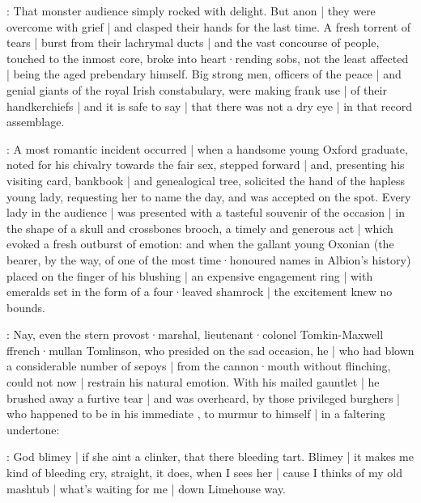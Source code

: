 :
That monster audience simply rocked with delight.
But anon |
they were overcome with grief |
and clasped their hands for the last time.
A fresh torrent of tears |
burst from their lachrymal ducts |
and the vast concourse of people,
touched to the inmost core,
broke into heart·rending sobs,
not the least affected |
being the aged prebendary himself.
Big strong men,
officers of the peace |
and genial giants of the royal Irish constabulary,
were making frank use |
of their handkerchiefs |
and it is safe to say |
that there was not a dry eye |
in that record assemblage.

:
A most romantic incident occurred |
when a handsome young Oxford graduate,
noted for his chivalry towards the fair sex,
stepped forward |
and,
presenting his visiting card,
bankbook |
and genealogical tree,
solicited the hand of the hapless young lady,
requesting her to name the day,
and was accepted on the spot.
Every lady in the audience |
was presented with a tasteful souvenir of the occasion |
in the shape of a skull and crossbones brooch,
a timely and generous act |
which evoked a fresh outburst of emotion:
and when the gallant young Oxonian
(the bearer,
by the way,
of one of the most time·honoured names in Albion's history)
placed on the finger of his blushing  |
an expensive engagement ring |
with emeralds set in the form of a four·leaved shamrock |
the excitement knew no bounds.

:
Nay,
even the stern provost·marshal,
lieutenant·colonel Tomkin-Maxwell ffrench·mullan Tomlinson,
who presided on the sad occasion,
he |
who had blown a considerable number of sepoys |
from the cannon·mouth without flinching,
could not now |
restrain his natural emotion.
With his mailed gauntlet |
he brushed away a furtive tear |
and was overheard,
by those privileged burghers |
who happened to be in his immediate ,
to murmur to himself |
in a faltering undertone:

\tomlinson:
God blimey |
if she aint a clinker,
that there bleeding tart.
Blimey |
it makes me kind of bleeding cry,
straight,
it does,
when I sees her |
cause I thinks of my old mashtub |
what's waiting for me |
down Limehouse way.

